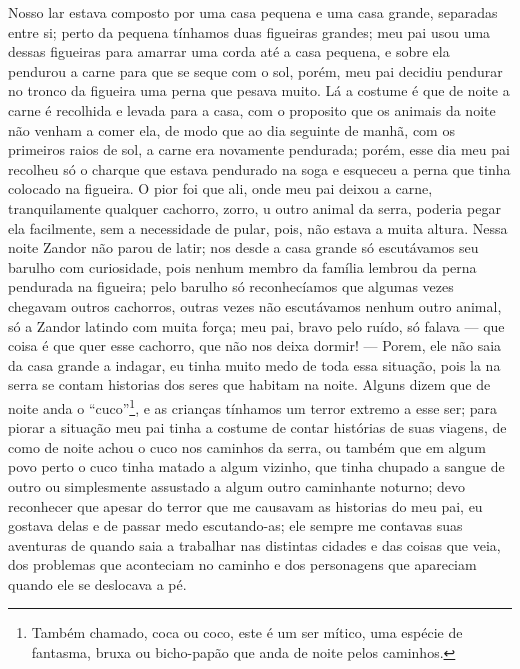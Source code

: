 Nosso lar estava composto por uma casa pequena e uma casa grande, separadas entre si; perto da pequena tínhamos duas figueiras grandes; meu pai usou uma dessas figueiras para amarrar uma corda até a casa pequena, e sobre ela pendurou a carne para que se seque com o sol, porém, meu pai decidiu pendurar no tronco da figueira uma perna que pesava muito.
Lá a costume é que de noite a carne é recolhida e levada para a casa, com o proposito que os animais da noite não venham a comer ela, de modo que ao dia seguinte de manhã, com os primeiros raios de sol, a carne era novamente pendurada; porém, esse dia meu pai recolheu só o charque que estava pendurado na soga e esqueceu a perna que tinha colocado na figueira. 
O pior foi que ali, onde meu pai deixou a carne, tranquilamente qualquer cachorro, zorro, u outro animal da serra, poderia pegar ela facilmente, sem a necessidade de pular, pois, não estava a muita altura.
Nessa noite Zandor não parou de latir; nos desde a casa grande só escutávamos seu barulho com curiosidade, pois nenhum membro da família lembrou da perna pendurada na figueira; pelo barulho só reconhecíamos que algumas vezes chegavam outros cachorros, outras vezes não escutávamos nenhum outro animal, só a Zandor latindo com muita força; meu pai, bravo pelo ruído, só falava --- que coisa é que quer esse cachorro, que não nos deixa dormir! --- Porem, ele não saia da casa grande a indagar, eu tinha muito medo de toda essa situação, pois la na serra se contam historias dos seres que habitam na noite. 
Alguns dizem que de noite anda o ``cuco''\footnote{Também chamado, coca ou coco, este é um ser mítico, uma espécie de fantasma, bruxa ou bicho-papão que anda de noite pelos caminhos.}, e as crianças tínhamos um terror extremo a esse ser; para piorar a situação meu pai tinha a costume de contar histórias de suas viagens, de como de noite achou o cuco nos caminhos da serra, ou também que em algum povo perto o cuco tinha matado a algum vizinho, que tinha chupado a sangue de outro ou simplesmente assustado a algum outro caminhante noturno; devo reconhecer que apesar do terror que me causavam as historias do meu pai, eu gostava delas e de passar medo escutando-as; ele sempre me contavas suas aventuras de quando saia a trabalhar nas distintas cidades e das coisas que veia, dos problemas que aconteciam no caminho e dos personagens que apareciam quando ele se deslocava a pé.

